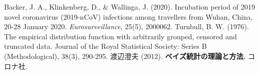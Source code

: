 \documentclass[a4paper,12pt]{jsarticle}
\begin{document}
\begin{thebibliography}{9}
\bibitem{} Backer, J. A., Klinkenberg, D., \& Wallinga, J. (2020). Incubation period of 2019 novel coronavirus (2019-nCoV) infections among travellers from Wuhan, China, 20-28 January 2020. \textit{Eurosurveillance}, 25(5), 2000062.
\bibitem{} Turnbull, B. W. (1976). The empirical distribution function with arbitrarily grouped, censored and truncated data. Journal of the Royal Statistical Society: Series B (Methodological), 38(3), 290-295.
\bibitem{} 渡辺澄夫 (2012). \textbf{ベイズ統計の理論と方法.} コロナ社.
\end{thebibliography}
\end{document}
